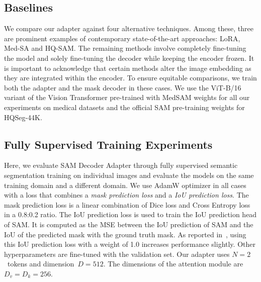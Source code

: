 \subsection{Baselines}
We compare our adapter against four alternative techniques. Among these, three are prominent examples of contemporary state-of-the-art approaches: LoRA, Med-SA and HQ-SAM. The remaining methods involve completely fine-tuning the model and solely fine-tuning the decoder while keeping the encoder frozen. It is important to acknowledge that certain methods alter the image embedding as they are integrated within the encoder. To ensure equitable comparisons, we train both the adapter and the mask decoder in these cases. We use the ViT-B/16 variant of the Vision Transformer pre-trained with MedSAM weights for all our experiments on medical datasets and the official SAM pre-training weights for HQSeg-44K.


\subsection{Fully Supervised Training Experiments}
Here, we evaluate SAM Decoder Adapter through fully supervised semantic segmentation training on individual images and evaluate the models on the same training domain and a different domain. 
We use AdamW optimizer in all cases with a loss that combines a \emph{mask prediction loss} and a \emph{IoU prediction loss}. The mask prediction loss is a linear combination of Dice loss and Cross Entropy loss in a 0.8:0.2 ratio. The IoU prediction loss is used to train the IoU prediction head of SAM. It is computed as the MSE between the IoU prediction of SAM and the IoU of the predicted mask with the ground truth mask. As reported in~, using this IoU prediction loss with a weight of 1.0 increases performance slightly. Other hyperparameters are fine-tuned with the validation set. Our adapter uses $N=2$~tokens and dimension~$D=512$. The dimensions of the attention module are~$D_v=D_k=256$.

